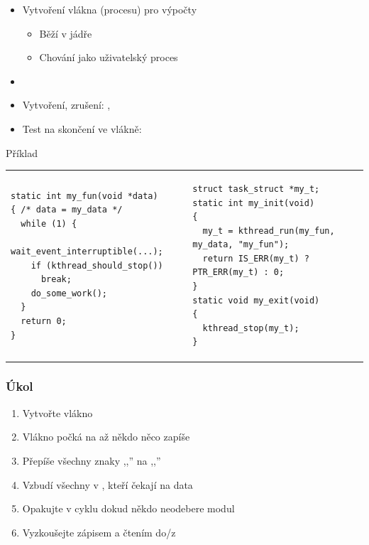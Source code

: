 \begin{frame}[fragile]{}

  \begin{itemize}
    \item Vytvoření vlákna (procesu) pro výpočty
    \begin{itemize}
      \item Běží v jádře
      \item Chování jako uživatelský proces
    \end{itemize}

    \pause

    \item {}
    \item Vytvoření, zrušení: , 
    \item Test na skončení ve vlákně: 
  \end{itemize}

  \pause

  \begin{block}{Příklad}
    \begin{center}
      \begin{tabular}{lp{}l}
	\begin{lstlisting}
static int my_fun(void *data)
{ /* data = my_data */
  while (1) {
    wait_event_interruptible(...);
    if (kthread_should_stop())
      break;
    do_some_work();
  }
  return 0;
}
	\end{lstlisting} & &

	\onslide<4->

	\begin{lstlisting}
struct task_struct *my_t;
static int my_init(void)
{
  my_t = kthread_run(my_fun, my_data, "my_fun");
  return IS_ERR(my_t) ? PTR_ERR(my_t) : 0;
}
static void my_exit(void)
{
  kthread_stop(my_t);
}
	\end{lstlisting}
      \end{tabular}
    \end{center}
  \end{block}

\end{frame}

\begin{frame}
  \frametitle{Úkol}

  \begin{enumerate}
    \item Vytvořte vlákno
    \item Vlákno počká na  až někdo něco zapíše
    \item Přepíše všechny znaky ,,'' na ,,''
    \item Vzbudí všechny v , kteří čekají na data
    \item Opakujte v cyklu dokud někdo neodebere modul
    \item Vyzkoušejte zápisem a čtením do/z 
  \end{enumerate}

\end{frame}

